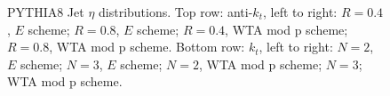 \begin{figure}[H]
\hfill
{}\hfill
\caption{PYTHIA8 Jet $\eta$ distributions. Top row: anti-$k_t$, left to right: $R=0.4$, $E$ scheme; $R=0.8$, $E$ scheme; $R=0.4$, WTA mod p scheme; $R=0.8$, WTA mod p scheme. Bottom row: $k_t$, left to right: $N=2$, $E$ scheme; $N=3$, $E$ scheme; $N=2$, WTA mod p scheme; $N=3$; WTA mod p scheme.}  
\end{figure}


